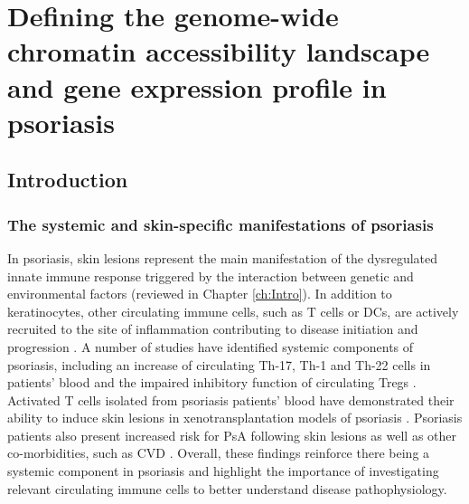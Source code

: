 \chapter{Defining the genome-wide chromatin accessibility landscape and gene expression profile in psoriasis}
\label{ch:Results2}


\section{Introduction}

\subsection{The systemic and skin-specific manifestations of psoriasis}

In psoriasis, skin lesions represent the main manifestation of the dysregulated innate immune response triggered by the interaction between genetic and environmental factors (reviewed in Chapter \ref{ch:Intro}). In addition to keratinocytes, other circulating immune cells, such as T cells or DCs, are actively recruited to the site of inflammation contributing to disease initiation and progression \parencite{Leanne2009}. A number of studies have identified systemic components of psoriasis, including an increase of circulating Th-17, Th-1 and Th-22 cells in patients' blood and the impaired inhibitory function of circulating Tregs \parencite{Kagami2010,Sugiyama2005}. Activated T cells isolated from psoriasis patients' blood have demonstrated their ability to induce skin lesions in xenotransplantation models of psoriasis \parencite{Wrone-Smith1996,Nickoloff1999}. Psoriasis patients also present increased risk for PsA following skin lesions as well as other co-morbidities, such as CVD \parencite{Ibrahim2009,Shapiro2007}. Overall, these findings reinforce there being a systemic component in psoriasis and highlight the importance of investigating relevant circulating immune cells to better understand disease pathophysiology.



